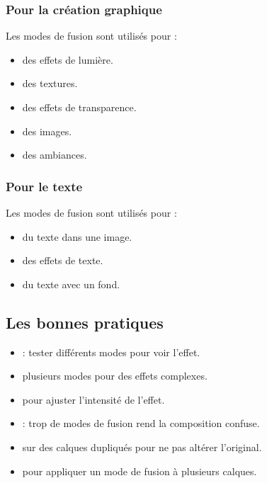 \subsubsection{Pour la création graphique}

Les modes de fusion sont utilisés pour :

\begin{itemize}
    \item {} des effets de lumière.
    \item {} des textures.
    \item {} des effets de transparence.
    \item {} des images.
    \item {} des ambiances.
\end{itemize}

\subsubsection{Pour le texte}

Les modes de fusion sont utilisés pour :

\begin{itemize}
    \item {} du texte dans une image.
    \item {} des effets de texte.
    \item {} du texte avec un fond.
\end{itemize}

\subsection{Les bonnes pratiques}

\begin{itemize}
    \item {} : tester différents modes pour voir l'effet.
    \item {} plusieurs modes pour des effets complexes.
    \item {} pour ajuster l'intensité de l'effet.
    \item {} : trop de modes de fusion rend la composition confuse.
    \item {} sur des calques dupliqués pour ne pas altérer l'original.
    \item {} pour appliquer un mode de fusion à plusieurs calques.
\end{itemize}

